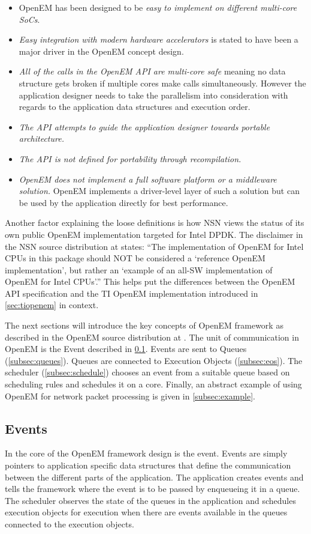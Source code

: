 \begin{itemize}
    \item OpenEM has been designed to be \emph{easy to implement on different multi-core SoCs}.
    \item \emph{Easy integration with modern hardware accelerators} is stated to have been a major driver in the OpenEM concept design.
    \item \emph{All of the calls in the OpenEM API are multi-core safe} meaning no data structure gets broken if multiple cores make calls simultaneously. However the application designer needs to take the parallelism into consideration with regards to the application data structures and execution order.
    \item \emph{The API attempts to guide the application designer towards portable architecture.}
    \item \emph{The API is not defined for portability through recompilation.}
    \item \emph{OpenEM does not implement a full software platform or a middleware solution.} OpenEM implements a driver-level layer of such a solution but can be used by the application directly for best performance.
\end{itemize}

Another factor explaining the loose definitions is how NSN views the status of its own public OpenEM implementation targeted for Intel DPDK. The disclaimer in the NSN source distribution at \cite{openempage} states: ``The implementation of OpenEM for Intel CPUs in this package should NOT be considered a `reference OpenEM implementation', but rather an `example of an all-SW implementation of OpenEM for Intel CPUs'.'' This helps put the differences between the OpenEM API specification and the TI OpenEM implementation introduced in \ref{sec:tiopenem} in context.

The next sections will introduce the key concepts of OpenEM framework as described in the OpenEM source distribution at \cite{openempage}. The unit of communication in OpenEM is the Event described in \ref{subsec:event}. Events are sent to Queues (\ref{subsec:queues}). Queues are connected to Execution Objects (\ref{subsec:eos}). The scheduler (\ref{subsec:schedule}) chooses an event from a suitable queue based on scheduling rules and schedules it on a core. Finally, an abstract example of using OpenEM for network packet processing is given in \ref{subsec:example}.

\subsection{Events}
\label{subsec:event}
In the core of the OpenEM framework design is the event. Events are simply pointers to application specific data structures that define the communication between the different parts of the application. The application creates events and tells the framework where the event is to be passed by enqueueing it in a queue. The scheduler observes the state of the queues in the application and schedules execution objects for execution when there are events available in the queues connected to the execution objects.~\cite{openemintro}

